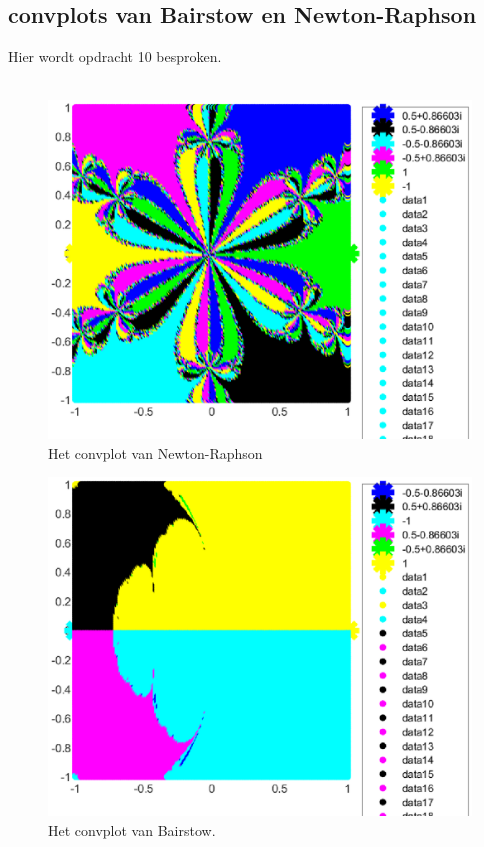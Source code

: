 \documentclass[a4paper,kulak]{kulakarticle}
\begin{document}
\subsection{convplots van Bairstow en Newton-Raphson}
Hier wordt opdracht 10 besproken.
\\~\\
\begin{figure}
	\label{img:nr}
	\includegraphics[scale = 0.6]{nrPlot}
	\caption{Het convplot van Newton-Raphson}
\end{figure}
\begin{figure}
	\label{img:br}
	\includegraphics[scale = 0.6]{brPlot}
	\caption{Het convplot van Bairstow.}
\end{figure}
\end{document}
